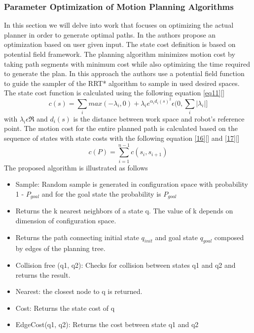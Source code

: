 \subsubsection{Parameter Optimization of Motion Planning Algorithms}
In this section we will delve into work that focuses on optimizing the actual planner in order to generate optimal paths. In \citet{Garcia2015} the authors propose an optimization based on user given input. The state cost definition is based on potential field framework. The planning algorithm minimizes motion cost by taking path segments with minimum cost while also optimizing the time required to generate the plan. In this approach the authors use a potential field function to guide the sampler of the RRT* algorithm to sample in used desired spaces. The state cost function is calculated using the following equation \eqref{eq11}[\citet{Garcia2015}]
\begin{equation}
\label{16}
c(s) = \sum_{i} max(-\lambda_{i},0 ) + \lambda_{i}e^{\alpha_{i}d_{i}(s)^2} \epsilon (0,\sum_{i}|\lambda_{i}|]
\end{equation}
with $\lambda_{i} \epsilon \Re$ and $d_{i}(s)$ is the distance between work space and robot's reference point. The motion cost for the entire planned path is calculated based on the sequence of states with state costs with the following equation \eqref{16}[\citet{Garcia2015}] and \eqref{17}[\citet{Garcia2015}]
\begin{equation}
\label{17}
c(P) = \sum_{i=1}^{n-1}c(s_{i},s_{i+1})
\end{equation}
The proposed algorithm is illustrated as follows
\begin{itemize}
\item Sample: Random sample is generated in configuration space with probability 1 - $P_{goal}$ and for the goal state the probability is $P_{goal}$
\item Returns the k nearest neighbors of a state q. The value of k depends on dimension of configuration space.
\item Returns the path connecting initial state $q_{init}$ and goal state $q_{goal}$ composed by edges of the planning tree.
\item Collision free (q1, q2): Checks for collision between states q1 and q2 and returns the result.
\item Nearest: the closest node to q is returned. 
\item Cost: Returns the state cost of q
\item EdgeCost(q1, q2): Returns the cost between state q1 and q2
\end{itemize}
